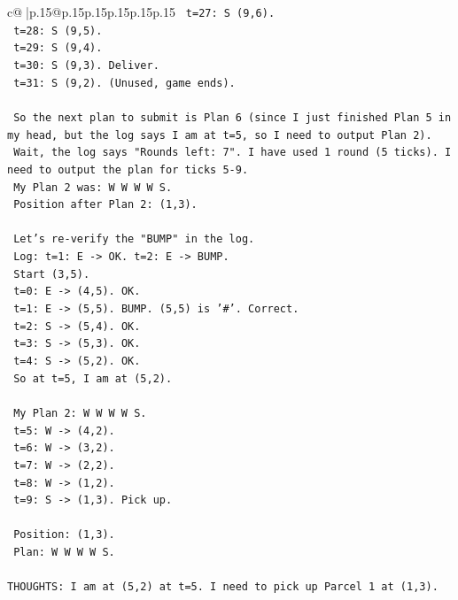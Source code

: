 \documentclass{article}
\begin{document}
{\begin{supertabular}{c@{$\;$}|p{.15\linewidth}@{}p{.15\linewidth}p{.15\linewidth}p{.15\linewidth}p{.15\linewidth}p{.15\linewidth}}
{{{\texttt{   t=27: S (9,6).} \\
\texttt{   t=28: S (9,5).} \\
\texttt{   t=29: S (9,4).} \\
\texttt{   t=30: S (9,3). Deliver.} \\
\texttt{   t=31: S (9,2). (Unused, game ends).} \\
\\ 
\texttt{   So the next plan to submit is Plan 6 (since I just finished Plan 5 in my head, but the log says I am at t=5, so I need to output Plan 2).} \\
\texttt{   Wait, the log says "Rounds left: 7". I have used 1 round (5 ticks). I need to output the plan for ticks 5{-}9.} \\
\texttt{   My Plan 2 was: W W W W S.} \\
\texttt{   Position after Plan 2: (1,3).} \\
\\ 
\texttt{   Let's re{-}verify the "BUMP" in the log.} \\
\texttt{   Log: t=1: E {-}> OK. t=2: E {-}> BUMP.} \\
\texttt{   Start (3,5).} \\
\texttt{   t=0: E {-}> (4,5). OK.} \\
\texttt{   t=1: E {-}> (5,5). BUMP. (5,5) is '\#'. Correct.} \\
\texttt{   t=2: S {-}> (5,4). OK.} \\
\texttt{   t=3: S {-}> (5,3). OK.} \\
\texttt{   t=4: S {-}> (5,2). OK.} \\
\texttt{   So at t=5, I am at (5,2).} \\
\\ 
\texttt{   My Plan 2: W W W W S.} \\
\texttt{   t=5: W {-}> (4,2).} \\
\texttt{   t=6: W {-}> (3,2).} \\
\texttt{   t=7: W {-}> (2,2).} \\
\texttt{   t=8: W {-}> (1,2).} \\
\texttt{   t=9: S {-}> (1,3). Pick up.} \\
\\ 
\texttt{   Position: (1,3).} \\
\texttt{   Plan: W W W W S.} \\
\\ 
\texttt{THOUGHTS: I am at (5,2) at t=5. I need to pick up Parcel 1 at (1,3).} \\
}}}
\end{supertabular}}
\end{document}
